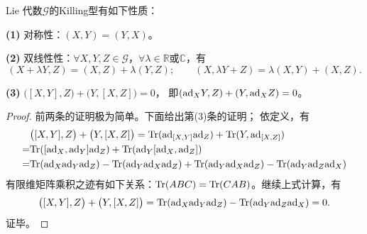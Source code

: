 \begin{theorem}\label{chlg:thm_Killing-sym}
     Lie 代数$\mathscr{G}$的Killing型有如下性质：
    
    {\bfseries (1)} 对称性：$(X,Y)=(Y,X)$。
    
    {\bfseries (2)} 双线性性：$\forall X,Y,Z\in \mathscr{G}$，$\forall \lambda \in \mathbb{R}$或$\mathbb{C}$，有
    \begin{equation*}
        (X+ \lambda Y ,Z)= (X,Z)+ \lambda (Y,Z); \qquad
        (X, \lambda Y +Z ) =  \lambda (X,Y)+ (X,Z).
    \end{equation*}

    {\bfseries (3)} $\bigl([X,Y], Z\bigr)+ \bigl(Y, [X,Z]\bigr)=0$，
    即$({\rm ad}_X Y, Z)+ (Y, {\rm ad}_X Z)=0$。
\end{theorem}
\begin{proof}
    前两条的证明极为简单。下面给出第(3)条的证明；    依定义，有
    \begin{align*}
        &\bigl([X,Y], Z\bigr) + \bigl(Y, [X,Z]\bigr) 
        =  {\rm Tr} ({\rm ad}_{[X,Y]}  {\rm ad}_Z) + {\rm Tr} (Y, {\rm ad}_{[X,Z]}) \\
        =& {\rm Tr} ([{\rm ad}_{X}, {\rm ad}_{Y}]  {\rm ad}_Z)
          +{\rm Tr} ({\rm ad}_Y [{\rm ad}_{X}, {\rm ad}_{Z}]  ) \\
        =& {\rm Tr} ({\rm ad}_{X} {\rm ad}_{Y}  {\rm ad}_Z) -{\rm Tr} ( {\rm ad}_{Y} {\rm ad}_{X}  {\rm ad}_Z)
          +{\rm Tr} ({\rm ad}_Y {\rm ad}_{X} {\rm ad}_{Z} ) -{\rm Tr} ({\rm ad}_Y {\rm ad}_{Z} {\rm ad}_{X}  )
    \end{align*}
    有限维矩阵乘积之迹有如下关系：${\rm Tr}(ABC)={\rm Tr}(CAB)$。继续上式计算，有
    \begin{equation*}\label{chlg:eqn_LA-compact}
        \bigl([X,Y], Z\bigr) + \bigl(Y, [X,Z]\bigr) 
        ={\rm Tr} ({\rm ad}_{X} {\rm ad}_{Y}  {\rm ad}_Z)  -{\rm Tr} ({\rm ad}_Y {\rm ad}_{Z} {\rm ad}_{X}  )
        =0 .
    \end{equation*}
    证毕。
\end{proof}




